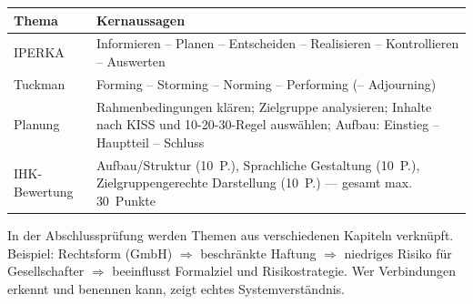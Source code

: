 \documentclass[11pt, a4paper]{article}
\begin{document}
\begin{center}
\begin{tabular}{p{3cm} p{10.5cm}}
\toprule
\textbf{Thema} & \textbf{Kernaussagen}\\
\midrule
IPERKA & Informieren -- Planen -- Entscheiden -- Realisieren -- Kontrollieren -- Auswerten\\
\addlinespace
Tuckman & Forming -- Storming -- Norming -- Performing (-- Adjourning)\\
\addlinespace
Planung & Rahmenbedingungen klären; Zielgruppe analysieren; Inhalte nach KISS und
          10-20-30-Regel auswählen; Aufbau: Einstieg -- Hauptteil -- Schluss\\
\addlinespace
IHK-Bewertung & Aufbau/Struktur (10~P.), Sprachliche Gestaltung (10~P.),
                Zielgruppengerechte Darstellung (10~P.) --- gesamt max. 30~Punkte\\
\bottomrule
\end{tabular}
\end{center}

\begin{merksatz}[title={\bfseries Prüfungstipp: Querverbindungen}]
In der Abschlussprüfung werden Themen aus verschiedenen Kapiteln verknüpft.
Beispiel: Rechtsform (GmbH) $\Rightarrow$ beschränkte Haftung $\Rightarrow$ niedriges Risiko
für Gesellschafter $\Rightarrow$ beeinflusst Formalziel und Risikostrategie.
Wer Verbindungen erkennt und benennen kann, zeigt echtes Systemverständnis.
\end{merksatz}
\end{document}
